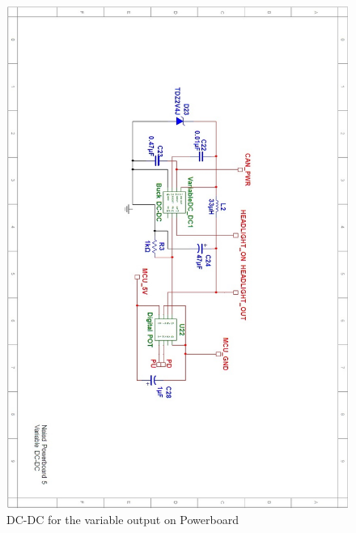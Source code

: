 \begin{figure}[!ht]
	\begin{center}
		\includegraphics[width=13.2cm]{./Images/Powerboard_Scematics/Variable.jpg}
		\caption{DC-DC for the variable output on Powerboard}
	\end{center}
\end{figure}

